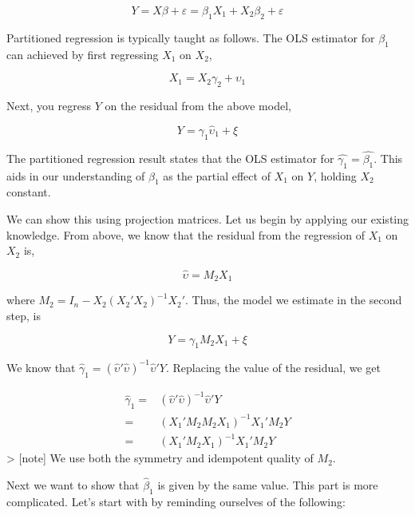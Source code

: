 \documentclass[
  letterpaper,
  DIV=11,
  numbers=noendperiod]{scrreprt}
\begin{document}
\[
Y = X\beta+ \varepsilon =\beta_1X_1+X_2\beta_2+\varepsilon
\]

Partitioned regression is typically taught as follows. The OLS estimator
for \(\beta_1\) can achieved by first regressing \(X_1\) on \(X_2\),

\[
X_1 = X_2\gamma_2+\upsilon_1
\]

Next, you regress \(Y\) on the residual from the above model,

\[
Y = \gamma_1 \hat{\upsilon}_1+\xi
\]

The partitioned regression result states that the OLS estimator for
\(\hat{\gamma_1}=\hat{\beta_1}\). This aids in our understanding of
\(\beta_1\) as the partial effect of \(X_1\) on \(Y\), holding \(X_2\)
constant.

We can show this using projection matrices. Let us begin by applying our
existing knowledge. From above, we know that the residual from the
regression of \(X_1\) on \(X_2\) is,

\[
\hat{\upsilon} = M_2X_1
\]

where \(M_2 = I_n-X_2(X_2'X_2)^{-1}X_2'\). Thus, the model we estimate
in the second step, is

\[
Y = \gamma_1M_2X_1+\xi
\]

We know that
\(\hat{\gamma}_1 = (\hat{\upsilon}'\hat{\upsilon})^{-1}\hat{\upsilon}'Y\).
Replacing the value of the residual, we get

\[
\begin{align}
\hat{\gamma}_1 =& (\hat{\upsilon}'\hat{\upsilon})^{-1}\hat{\upsilon}'Y \\
=&(X_1'M_2M_2X_1)^{-1}X_1'M_2Y \\
=&(X_1'M_2X_1)^{-1}X_1'M_2Y
\end{align}
\] \textgreater{} {[}note{]} We use both the symmetry and idempotent
quality of \(M_2\).

Next we want to show that \(\hat{\beta}_1\) is given by the same value.
This part is more complicated. Let's start with by reminding ourselves
of the following:
\end{document}
